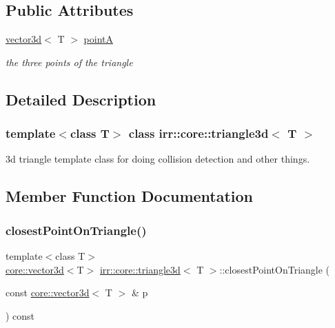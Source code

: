 \subsection*{Public Attributes}
\begin{DoxyCompactItemize}
\item 
\mbox{\label{classirr_1_1core_1_1triangle3d_af7ed3493a77f7f9a9f0d010f8b270767}} 
\hyperlink{classirr_1_1core_1_1vector3d}{vector3d}$<$ T $>$ \hyperlink{classirr_1_1core_1_1triangle3d_af7ed3493a77f7f9a9f0d010f8b270767}{pointA}
\begin{DoxyCompactList}\small\item\em the three points of the triangle \end{DoxyCompactList}\end{DoxyCompactItemize}


\subsection{Detailed Description}
\subsubsection*{template$<$class T$>$\newline
class irr\+::core\+::triangle3d$<$ T $>$}

3d triangle template class for doing collision detection and other things. 

\subsection{Member Function Documentation}
\mbox{\label{classirr_1_1core_1_1triangle3d_a0212c09e6804a7a25c3fef791b6b1336}} 
\subsubsection{\texorpdfstring{closest\+Point\+On\+Triangle()}{closestPointOnTriangle()}\hspace{0.1cm}{\footnotesize\ttfamily [1/2]}}
{\footnotesize\ttfamily template$<$class T$>$ \\
\hyperlink{classirr_1_1core_1_1vector3d}{core\+::vector3d}$<$T$>$ \hyperlink{classirr_1_1core_1_1triangle3d}{irr\+::core\+::triangle3d}$<$ T $>$\+::closest\+Point\+On\+Triangle (\begin{DoxyParamCaption}\item[{const \hyperlink{classirr_1_1core_1_1vector3d}{core\+::vector3d}$<$ T $>$ \&}]{p }\end{DoxyParamCaption}) const\hspace{0.3cm}{\ttfamily [inline]}}



